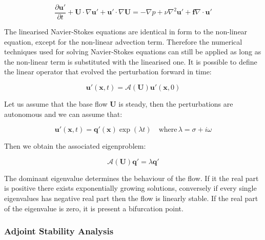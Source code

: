 \begin{subequations}
\begin{equation}
  \frac{\partial \mathbf{u'}}{\partial t} + \mathbf{U} \cdot  \nabla \mathbf{u'}+\mathbf{u'} \cdot \nabla \mathbf{U} = -\nabla p + \nu \nabla^2 \mathbf{u'} + \mathbf{f}
\end{equation}

\begin{equation}
\nabla \cdot \mathbf{u'}
\end{equation}

\end{subequations}



The linearised Navier-Stokes equations are identical in form to the non-linear equation, except for the non-linear advection term. Therefore the numerical techniques used for solving Navier-Stokes equations can still be applied as long as the non-linear term is substituted with the linearised one. It is possible to define the linear operator that evolved the perturbation forward in time:

\begin{equation}
   \mathbf{u'}(\mathbf{x},t)=\mathcal{A}(\mathbf{U})\mathbf{u'}(\mathbf{x},0)
\end{equation}

Let us assume that the base flow  $\mathbf{U}$ is steady, then the perturbations are autonomous and we can assume that:

\begin{equation}
   \mathbf{u'}(\mathbf{x},t)=\mathbf{q'}(\mathbf{x})\exp(\lambda t) \quad \mbox{where} \, \lambda=\sigma+i \omega
\end{equation}

Then we obtain the associated eigenproblem:

\begin{equation}
   \mathcal{A}(\mathbf{U})\mathbf{q'}=\lambda \mathbf{q'}
\end{equation}

The dominant eigenvalue determines the behaviour of the flow. If it the real part is positive there exists exponentially growing solutions, conversely if every single eigenvalues has negative real part then the flow is linearly stable. If the real part of the eigenvalue is zero, it is present a bifurcation point.

\subsubsection{Adjoint Stability Analysis}

